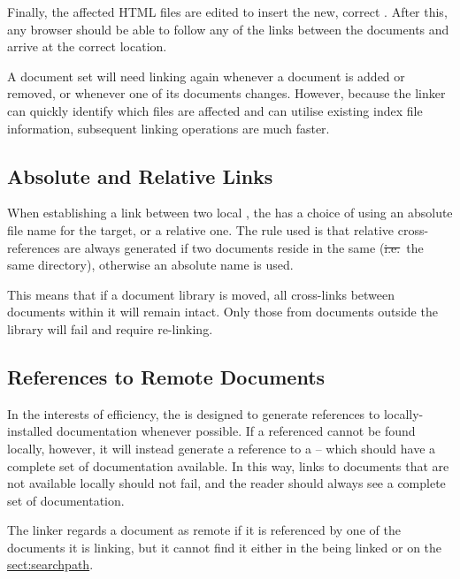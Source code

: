 Finally, the affected HTML files are edited to insert the new, correct
. After this, any  browser should be able to
follow any of the links between the documents and arrive at the
correct location.

A document set will need linking again whenever a document is added or
removed, or whenever one of its documents changes. However, because
the linker can quickly identify which files are affected and can
utilise existing index file information, subsequent linking operations
are much faster.

\subsection{Absolute and Relative Links}

When establishing a link between two local , the
  has a choice of using an absolute file
name for the target, or a relative one. The rule used is that relative
cross-references are always generated if two documents reside in the
same  (\st{i.e.}\ the same directory),
otherwise an absolute name is used.

This means that if a document library is moved, all cross-links
between documents within it will remain intact. Only those from
documents outside the library will fail and require re-linking.

\subsection{\label{sect:remotedocuments}References to Remote Documents}

In the interests of efficiency, the   is
designed to generate references to locally-installed documentation
whenever possible. If a referenced  cannot be found
locally, however, it will instead generate a reference to a
 -- which should have a complete set
of documentation available.  In this way, links to documents that are
not available locally should not fail, and the reader should always
see a complete set of documentation.

The linker regards a document as remote if it is referenced by one of
the documents it is linking, but it cannot find it either in the
 being linked or on the \hyperref{\hi{HTX\_PATH}
search path}{\hi{HTX\_PATH} search path (see \S}{)}{sect:searchpath}.

